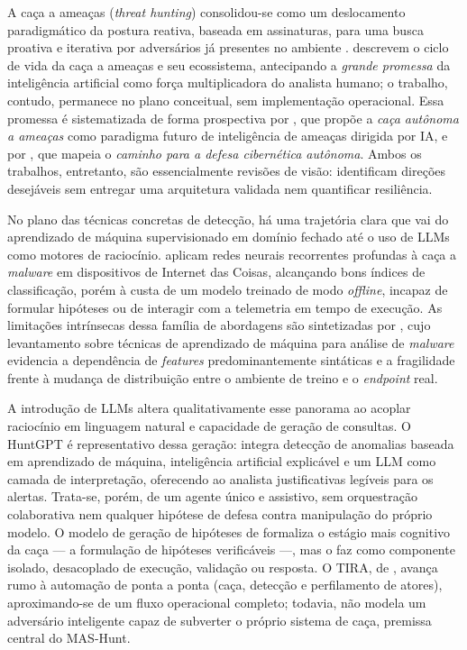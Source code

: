 A caça a ameaças (\textit{threat hunting}) consolidou-se como um deslocamento
paradigmático da postura reativa, baseada em assinaturas, para uma busca
proativa e iterativa por adversários já presentes no ambiente
\cite{hillier2022turninghuntedhunterthreat}. 
descrevem o ciclo de vida da caça a ameaças e seu ecossistema, antecipando a
\textit{grande promessa} da inteligência artificial como força multiplicadora do
analista humano; o trabalho, contudo, permanece no plano conceitual, sem
implementação operacional. Essa promessa é sistematizada de forma prospectiva por
, que propõe a \textit{caça autônoma a ameaças} como
paradigma futuro de inteligência de ameaças dirigida por IA, e por
, que mapeia o \textit{caminho para a defesa cibernética
autônoma}. Ambos os trabalhos, entretanto, são essencialmente revisões de visão:
identificam direções desejáveis sem entregar uma arquitetura validada nem
quantificar resiliência.

No plano das técnicas concretas de detecção, há uma trajetória clara que vai do
aprendizado de máquina supervisionado em domínio fechado até o uso de LLMs como
motores de raciocínio.  aplicam redes neurais
recorrentes profundas à caça a \textit{malware} em dispositivos de Internet das
Coisas, alcançando bons índices de classificação, porém à custa de um modelo
treinado de modo \textit{offline}, incapaz de formular hipóteses ou de interagir
com a telemetria em tempo de execução. As limitações intrínsecas dessa família de
abordagens são sintetizadas por , cujo levantamento sobre
técnicas de aprendizado de máquina para análise de \textit{malware} evidencia a
dependência de \textit{features} predominantemente sintáticas e a fragilidade
frente à mudança de distribuição entre o ambiente de treino e o \textit{endpoint}
real.

A introdução de LLMs altera qualitativamente esse panorama ao acoplar raciocínio
em linguagem natural e capacidade de geração de consultas. O HuntGPT
\cite{ali2023huntgptintegratingmachinelearningbased} é representativo dessa
geração: integra detecção de anomalias baseada em aprendizado de máquina,
inteligência artificial explicável e um LLM como camada de interpretação,
oferecendo ao analista justificativas legíveis para os alertas. Trata-se,
porém, de um agente único e assistivo, sem orquestração colaborativa nem
qualquer hipótese de defesa contra manipulação do próprio modelo. O modelo de
geração de hipóteses de  formaliza o estágio mais cognitivo
da caça --- a formulação de hipóteses verificáveis ---, mas o faz como
componente isolado, desacoplado de execução, validação ou resposta. O TIRA, de
, avança rumo à automação de ponta a ponta (caça, detecção e
perfilamento de atores), aproximando-se de um fluxo operacional completo;
todavia, não modela um adversário inteligente capaz de subverter o próprio
sistema de caça, premissa central do MAS-Hunt.

